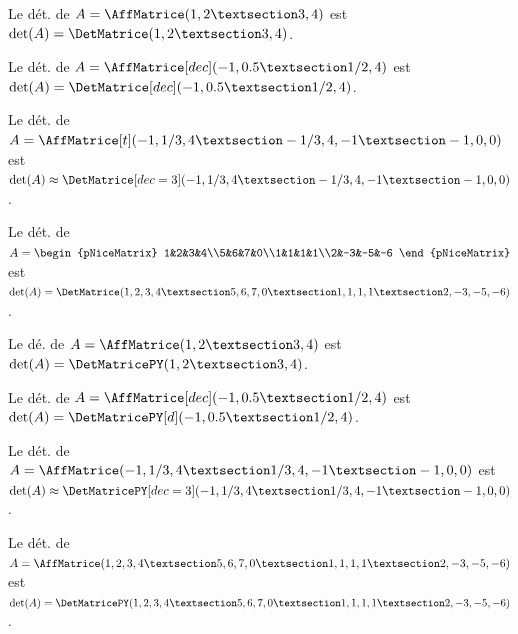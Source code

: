 \documentclass[french,a4paper,11pt]{article}
\begin{document}
\begin{PresentationCode}{}
Le dét. de $A=\AffMatrice(1,2 § 3,4)$ est
$\det(A)=\DetMatrice(1,2 § 3,4)$.
\end{PresentationCode}

\begin{PresentationCode}{}
Le dét. de $A=\AffMatrice[dec](-1,0.5 § 1/2,4)$ est
$\det(A)=\DetMatrice[dec](-1,0.5 § 1/2,4)$.
\end{PresentationCode}

\begin{PresentationCode}{}
Le dét. de $A=\AffMatrice[t](-1,1/3,4 § -1/3,4,-1 § -1,0,0)$ est
$\det(A) \approx \DetMatrice[dec=3](-1,1/3,4 § -1/3,4,-1 § -1,0,0)$.
\end{PresentationCode}

\begin{PresentationCode}{}
Le dét. de $A=\begin{pNiceMatrix} 1&2&3&4\\5&6&7&0\\1&1&1&1\\2&-3&-5&-6 \end{pNiceMatrix}$
est $\det(A)=\DetMatrice(1,2,3,4 § 5,6,7,0 § 1,1,1,1 § 2,-3,-5,-6)$.
\end{PresentationCode}

\begin{PresentationCode}{}
Le dé. de $A=\AffMatrice(1,2 § 3,4)$ est
$\det(A)=\DetMatricePY(1,2 § 3,4)$.
\end{PresentationCode}

\begin{PresentationCode}{}
Le dét. de $A=\AffMatrice[dec](-1,0.5 § 1/2,4)$ est
$\det(A)=\DetMatricePY[d](-1,0.5 § 1/2,4)$.
\end{PresentationCode}

\begin{PresentationCode}{}
Le dét. de $A=\AffMatrice(-1,1/3,4 § 1/3,4,-1 § -1,0,0)$ est
$\det(A) \approx \DetMatricePY[dec=3](-1,1/3,4 § 1/3,4,-1 § -1,0,0)$.
\end{PresentationCode}

\begin{PresentationCode}{}
Le dét. de $A=\AffMatrice(1,2,3,4 § 5,6,7,0 § 1,1,1,1 § 2,-3,-5,-6)$
est $\det(A)=\DetMatricePY(1,2,3,4 § 5,6,7,0 § 1,1,1,1 § 2,-3,-5,-6)$.
\end{PresentationCode}

\pagebreak
\end{document}
